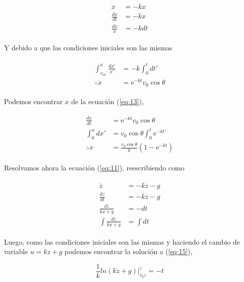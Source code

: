 \documentclass[a4paper,10pt]{article}
\numberwithin{equation}{section}
\newcommand{\euler}{\mathrm{e}}
\begin{document}
\begin{align}
\begin{split}
 \ddot{x} &= - k \dot{x} \\
 \frac{d \dot{x}}{dt} &= - k \dot{x} \\
 \frac{d \dot{x}}{\dot{x}} &= - k dt
 \end{split}
\end{align}

Y debido a que las condiciones iniciales son las mismas

\begin{align}
  \begin{split}
  \int_{v_{ox}}^{\dot{x}} \frac{d \dot{x}'}{\dot{x}'} &= - k \int_0^t dt' \\
  \therefore \dot{x} &= \euler^{-kt} v_0 \cos{\theta}
  \end{split}
  \label{eq:13}
 \end{align}

Podemos encontrar $x$ de la ecuación (\ref{eq:13}),

\begin{align}
  \begin{split}
  \frac{dx}{dt} &= \euler^{-kt} v_0 \cos{\theta} \\
  \int_0^x dx' &= v_0 \cos{\theta} \int_0^t \euler^{-kt'} \\
  \therefore x &= \frac{v_0\cos{\theta}}{k}(1 - \euler^{-kt}) 
  \end{split}
  \label{eq:14}
 \end{align}

Resolvamos ahora la ecuación (\ref{eq:11}), reescribiendo como

\begin{align}
\begin{split}
 \ddot{z} &= - k \dot{z} - g \\
 \frac{d \dot{z}}{dt} &= - k \dot{z} -g \\
 \frac{d \dot{z}}{k\dot{x} +g} &= - dt \\
 \int \frac{d \dot{z}}{k\dot{x} +g} &= \int dt
 \end{split}
 \label{eq:15}
\end{align}

Luego, como las condiciones iniciales son las mismas y haciendo el
cambio de variable $u=k\dot{z}+g$ podemos encontrar la solución a 
(\ref{eq:15}),

\begin{equation}
 \frac{1}{k} ln (k\dot{z}+g)|_{v_0z}^{\dot{z}} = -t
\end{equation}
\end{document}
